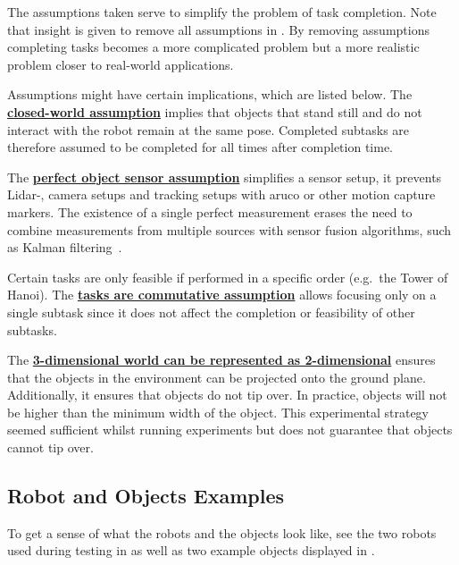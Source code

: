 The assumptions taken serve to simplify the problem of task completion. Note that insight is given to remove all assumptions in . By removing assumptions completing tasks becomes a more complicated problem but a more realistic problem closer to real-world applications.\bs

Assumptions might have certain implications, which are listed below. The \hyperref[assumption:closed_world]{\textbf{closed-world assumption}} implies that objects that stand still and do not interact with the robot remain at the same pose. Completed subtasks are therefore assumed to be completed for all times after completion time.\bs

The \hyperref[assumption:perfect_object_sensor]{\textbf{perfect object sensor assumption}} simplifies a sensor setup, it prevents Lidar-, camera setups and tracking setups with aruco or other motion capture markers. The existence of a single perfect measurement erases the need to combine measurements from multiple sources with sensor fusion algorithms, such as Kalman filtering~\cite{verhaegen_filtering_2007}.\bs

Certain tasks are only feasible if performed in a specific order (e.g.~the Tower of Hanoi). The \hyperref[assumption:order_does_not_matter]{\textbf{tasks are commutative assumption}} allows focusing only on a single subtask since it does not affect the completion or feasibility of other subtasks.\bs

The \hyperref[assumption:no_tipping]{\textbf{3-dimensional world can be represented as 2-dimensional}} ensures that the objects in the environment can be projected onto the ground plane. Additionally, it ensures that objects do not tip over. In practice, objects will not be higher than the minimum width of the object. This experimental strategy seemed sufficient whilst running experiments but does not guarantee that objects cannot tip over.

\subsection{Robot and Objects Examples}
To get a sense of what the robots and the objects look like, see the two robots used during testing in  as well as two example objects displayed in .

